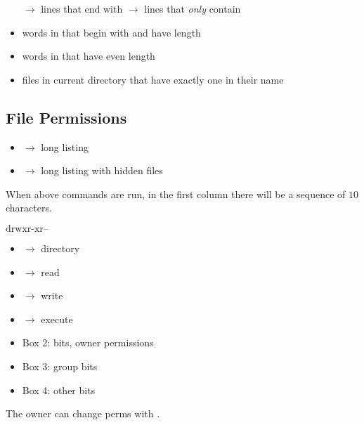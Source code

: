 \begin{itemize}
    \subitem {} $ \rightarrow $ lines that end with 
    \subitem {} 
    $ \rightarrow $ lines that \emph{only} contain
    \item words in  that begin with  and have length
    \subitem {}
    \item words in  that have even length
    \subitem {}
    \item files in current directory that have exactly one  in their
    name
    \subitem {}
\end{itemize}

\subsection{File Permissions}

\begin{itemize}
    \item {} $ \rightarrow $ long listing
    \item {} $ \rightarrow $ long listing with hidden files
\end{itemize}
When above commands are run, in the first column there will be a sequence
of $ 10 $ characters.

\begin{center}
    $\boxed{\text{d}}$$\boxed{\text{rwx}}$$\boxed{\text{r-x}}$$\boxed{\text{r--}}$
\end{center}
\begin{itemize}
    \item {} $ \rightarrow $ directory
    \item {} $ \rightarrow $ read
    \item {} $ \rightarrow $ write
    \item {} $ \rightarrow $ execute
    \item Box 2:  bits, owner permissions
    \item Box 3: group bits
    \item Box 4: other bits
\end{itemize}
The owner can change perms with .


